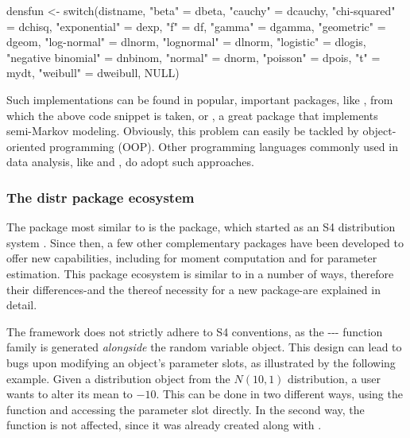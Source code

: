 \documentclass[nojss]{jss}
\newcommand{\fct}[1]{\code{#1()}}
\begin{document}
\begin{CodeChunk}
\begin{CodeInput}
densfun <- switch(distname,
                   "beta" = dbeta,
                   "cauchy" = dcauchy,
                   "chi-squared" = dchisq,
                   "exponential" = dexp,
                   "f" = df,
                   "gamma" = dgamma,
                   "geometric" = dgeom,
                   "log-normal" = dlnorm,
                   "lognormal" = dlnorm,
                   "logistic" = dlogis,
                   "negative binomial" = dnbinom,
                   "normal" = dnorm,
                   "poisson" = dpois,
                   "t" = mydt,
                   "weibull" = dweibull,
                   NULL)
\end{CodeInput}
\end{CodeChunk}

Such implementations can be found in popular, important  packages, like , from which the above code snippet is taken, or , a great package that implements semi-Markov modeling. Obviously, this problem can easily be tackled by object-oriented programming (OOP). Other programming languages commonly used in data analysis, like  and , do adopt such approaches.

\subsubsection[The distr package ecosystem]{The distr package ecosystem}\label{ss:distr}

The  package most similar to  is the  package, which started as an S4 distribution system \citep{distr2006, distr2014}. Since then, a few other complementary packages have been developed to offer new capabilities, including  for moment computation and  for parameter estimation. This package ecosystem is similar to  in a number of ways, therefore their differences-and the thereof necessity for a new package-are explained in detail.

The  framework does not strictly adhere to S4 conventions, as the \fct{d}-\fct{p}-\fct{q}-\fct{r} function family is generated \emph{alongside} the random variable object. This design can lead to bugs upon modifying an object's parameter slots, as illustrated by the following example. Given a distribution object  from the $N(10, 1)$ distribution, a user wants to alter its mean to $-10$. This can be done in two different ways, using the  function  and accessing the parameter slot directly. In the second way, the \fct{r} function is not affected, since it was already created along with .
\end{document}

